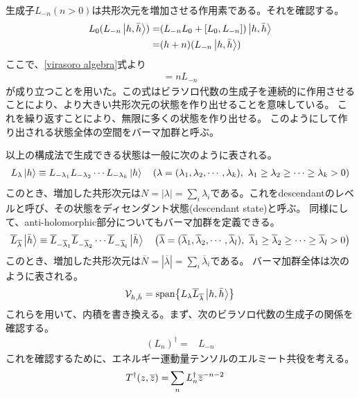 \documentclass[11pt, dvipdfmx]{article}
\numberwithin{equation}{section}
\newcommand{\blankline}{\par\vspace{\baselineskip}} %
\begin{document}
生成子$L_{-n}(n>0)$は共形次元を増加させる作用素である。それを確認する。
\begin{align}
    L_0(L_{-n}\ket{h,\bar{h}})=&(L_{-n}L_0+[L_0,L_{-n}])\ket{h,\bar{h}}\\
    =& (h+n)(L_{-n}\ket{h,\bar{h}})
\end{align}
ここで、\eqref{virasoro algebra}式より
\begin{align}
    [L_0,L_{-n}]=nL_{-n}
\end{align}
が成り立つことを用いた。この式はビラソロ代数の生成子を連続的に作用させることにより、より大きい共形次元の状態を作り出せることを意味している。
これを繰り返すことにより、無限に多くの状態を作り出せる。
このようにして作り出される状態全体の空間をバーマ加群と呼ぶ。
\blankline
以上の構成法で生成できる状態は一般に次のように表される。
\begin{align}
    L_{\lambda}\ket{h}\equiv L_{-\lambda_1}L_{-\lambda_2}\cdots L_{-\lambda_k}\ket{h}\ \ \ (\lambda=(\lambda_1,\lambda_2,\cdots,\lambda_k),\ \lambda_1\geq \lambda_2\geq \cdots \geq \lambda_k>0)
\end{align}
このとき、増加した共形次元は$N=|\lambda|=\sum_i \lambda_i$である。これをdescendantのレベルと呼び、その状態をディセンダント状態(descendant state)と呼ぶ。
同様にして、anti-holomorphic部分についてもバーマ加群を定義できる。
\begin{align}
    \overline{L}_{\overline{\lambda}}\ket{\bar{h}}\equiv \overline{L}_{-\overline{\lambda}_1}\overline{L}_{-\overline{\lambda}_2}\cdots \overline{L}_{-\overline{\lambda}_l}\ket{\bar{h}}\ \ \ \qty(\overline{\lambda}=(\overline{\lambda}_1,\overline{\lambda}_2,\cdots,\overline{\lambda}_l),\ \overline{\lambda}_1\geq \overline{\lambda}_2\geq \cdots \geq \overline{\lambda}_l>0)
\end{align}
このとき、増加した共形次元は$\overline{N}=|\overline{\lambda}|=\sum_i \overline{\lambda}_i$である。
バーマ加群全体は次のように表される。
\begin{align}
    \mathcal{V}_{h,\bar{h}}=\text{span}\qty{L_{\lambda}\overline{L}_{\overline{\lambda}}\ket{h,\bar{h}}}
\end{align}
これらを用いて、内積を書き換える。まず、次のビラソロ代数の生成子の関係を確認する。
\begin{align}
    (L_n)^\dagger=&L_{-n}\label{L dagger}
\end{align}
これを確認するために、エネルギー運動量テンソルのエルミート共役を考える。
\begin{align}
    T^\dagger(z,\overline{z})=&\sum_{n}L_n^\dagger \overline{z}^{-n-2}\notag
\end{align}
\end{document}
